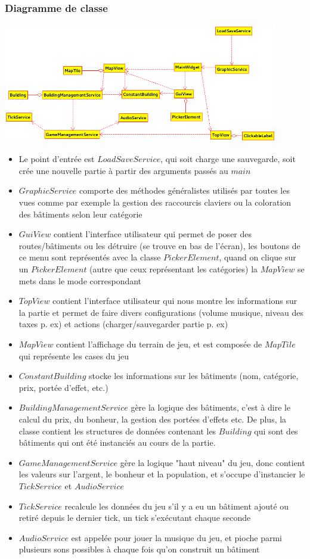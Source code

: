 \documentclass[a4paper,10pt,openany,oneside]{report}
\begin{document}
\subsubsection{Diagramme de classe}
\includegraphics[width=0.9\textwidth]{img/hierarchieClasses.png}
\begin{itemize}
\item Le point d'entrée est $LoadSaveService$, qui soit charge une sauvegarde, soit crée une nouvelle partie à partir des arguments passés au $main$
\item $GraphicService$ comporte des méthodes généralistes utilisés par toutes les vues comme par exemple la gestion des raccourcis claviers ou la coloration des bâtiments selon leur catégorie
\item $GuiView$ contient l'interface utilisateur qui permet de poser des routes/bâtiments ou les détruire (se trouve en bas de l'écran), les boutons de ce menu sont représentés avec la classe $PickerElement$, quand on clique sur un $PickerElement$ (autre que ceux représentant les catégories) la $MapView$ se mets dans le mode correspondant
\item $TopView$ contient l'interface utilisateur qui nous montre les informations sur la partie et permet de faire divers configurations (volume musique, niveau des taxes p. ex) et actions  (charger/sauvegarder partie p. ex)
\item $MapView$ contient l'affichage du terrain de jeu, et est composée de $MapTile$ qui représente les cases du jeu
\item $ConstantBuilding$ stocke les informations sur les bâtiments (nom, catégorie, prix, portée d'effet, etc.)
\item $BuildingManagementService$ gère la logique des bâtiments, c'est à dire le calcul du prix, du bonheur, la gestion des portées d'effets etc. De plus, la classe contient les structures de données contenant les $Building$ qui sont des bâtiments qui ont été instanciés au cours de la partie.
\item $GameManagementService$ gère la logique "haut niveau" du jeu, donc contient les valeurs sur l'argent, le bonheur et la population, et s'occupe d'instancier le $TickService$ et $AudioService$
\item $TickService$ recalcule les données du jeu s'il y a eu un bâtiment ajouté ou retiré depuis le dernier tick, un tick s'exécutant chaque seconde
\item $AudioService$ est appelée pour jouer la musique du jeu, et pioche parmi plusieurs sons possibles à chaque fois qu'on construit un bâtiment
\end{itemize}
\end{document}
